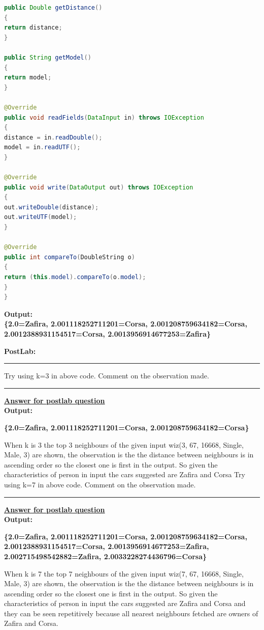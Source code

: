\documentclass[11pt,article]{memoir}
\begin{document}
\begin{flushleft}
\begin{lstlisting}[language=java]
public Double getDistance()
{
return distance;
}

public String getModel()
{
return model;
}

@Override
public void readFields(DataInput in) throws IOException
{
distance = in.readDouble();
model = in.readUTF();
}

@Override
public void write(DataOutput out) throws IOException
{
out.writeDouble(distance);
out.writeUTF(model);
}

@Override
public int compareTo(DoubleString o)
{
return (this.model).compareTo(o.model);
}
}
\end{lstlisting}

\noindent \textbf{Output: }\\
\parskip 10mm
\noindent \textbf{\{2.0=Zafira, 2.001118252711201=Corsa, 2.001208759634182=Corsa, 2.0012388931154517=Corsa, 2.0013956914677253=Zafira\}}



\newpage
\textbf{PostLab:}\hrule
Try using k=3 in above code. Comment on the observation made.\\
\hrule
\textbf{\underline{Answer for postlab question}} \\                       
\noindent \textbf{Output: }
\parskip 10mm

\noindent \textbf{\{2.0=Zafira, 2.001118252711201=Corsa, 2.001208759634182=Corsa\}}


\noindent When k is 3 the top 3 neighbours of the given input wiz(3, 67, 16668, Single, Male, 3) are shown, the observation is the the distance between neighbours is in  ascending order so the closest one is first in the output. So given the characteristics of person in input the cars suggested are Zafira and Corsa           
\newpage
Try using k=7 in above code. Comment on the observation made.\\
\hrule
\textbf{\underline{Answer for postlab question}}\\
\noindent \textbf{Output: }
\parskip 10mm

\noindent \textbf{\{2.0=Zafira, 2.001118252711201=Corsa, 2.001208759634182=Corsa, 2.0012388931154517=Corsa, 2.0013956914677253=Zafira, 2.002715498542882=Zafira, 2.0033228274436796=Corsa\}}

\noindent When k is 7 the top 7 neighbours of the given input wiz(7, 67, 16668, Single, Male, 3) are shown, the observation is the the distance between neighbours is in  ascending order so the closest one is first in the output. So given the characteristics of person in input the cars suggested are Zafira and Corsa and they can be seen repetitively because all nearest neighbours fetched are owners of Zafira and Corsa.     
\end{flushleft}
\end{document}
